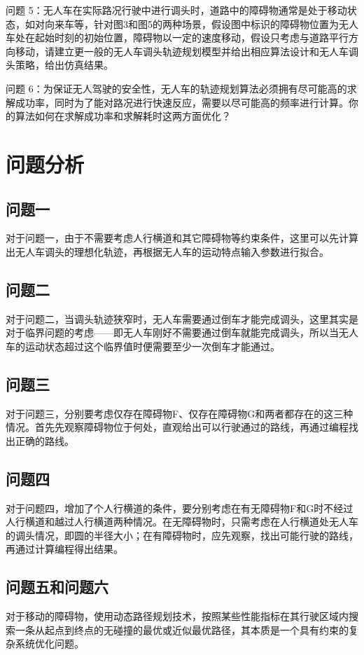 \documentclass{article}
\begin{document}
问题 5：无人车在实际路况行驶中进行调头时，道路中的障碍物通常是处于移动状态，如对向来车等，针对图3和图5的两种场景，假设图中标识的障碍物位置为无人车处在起始时刻的初始位置，障碍物以一定的速度移动，假设只考虑与道路平行方向移动，请建立更一般的无人车调头轨迹规划模型并给出相应算法设计和无人车调头策略，给出仿真结果。

\vspace{1ex}
问题 6：为保证无人驾驶的安全性，无人车的轨迹规划算法必须拥有尽可能高的求解成功率，同时为了能对路况进行快速反应，需要以尽可能高的频率进行计算。你的算法如何在求解成功率和求解耗时这两方面优化？

\newpage
\section{问题分析}
\subsection{问题一}
对于问题一，由于不需要考虑人行横道和其它障碍物等约束条件，这里可以先计算出无人车调头的理想化轨迹，再根据无人车的运动特点输入参数进行拟合。
\subsection{问题二}
对于问题二，当调头轨迹狭窄时，无人车需要通过倒车才能完成调头，这里其实是对于临界问题的考虑——即无人车刚好不需要通过倒车就能完成调头，所以当无人车的运动状态超过这个临界值时便需要至少一次倒车才能通过。
\subsection{问题三}
对于问题三，分别要考虑仅存在障碍物F、仅存在障碍物G和两者都存在的这三种情况。首先先观察障碍物位于何处，直观给出可以行驶通过的路线，再通过编程找出正确的路线。
\subsection{问题四}
对于问题四，增加了个人行横道的条件，要分别考虑在有无障碍物F和G时不经过人行横道和越过人行横道两种情况。在无障碍物时，只需考虑在人行横道处无人车的调头情况，即圆的半径大小；在有障碍物时，应先观察，找出可能行驶的路线，再通过计算编程得出结果。
\subsection{问题五和问题六}
对于移动的障碍物，使用动态路径规划技术，按照某些性能指标在其行驶区域内搜索一条从起点到终点的无碰撞的最优或近似最优路径，其本质是一个具有约束的复杂系统优化问题。
\end{document}
